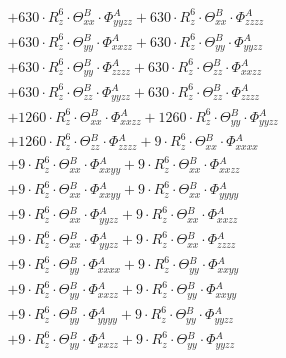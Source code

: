 \documentclass{article}
\begin{document}
\begin{subequations}
\begin{gather}
\begin{array}{c}
 \\[0.2em] 		 + 630 \cdot R_{z}^{6} \cdot \Theta{}^{B}_{xx} \cdot \Phi{}^{A}_{yyzz}+ 630 \cdot R_{z}^{6} \cdot \Theta{}^{B}_{xx} \cdot \Phi{}^{A}_{zzzz} 
 \\[0.2em] 		 + 630 \cdot R_{z}^{6} \cdot \Theta{}^{B}_{yy} \cdot \Phi{}^{A}_{xxzz}+ 630 \cdot R_{z}^{6} \cdot \Theta{}^{B}_{yy} \cdot \Phi{}^{A}_{yyzz} 
 \\[0.2em] 		 + 630 \cdot R_{z}^{6} \cdot \Theta{}^{B}_{yy} \cdot \Phi{}^{A}_{zzzz}+ 630 \cdot R_{z}^{6} \cdot \Theta{}^{B}_{zz} \cdot \Phi{}^{A}_{xxzz} 
 \\[0.2em] 		 + 630 \cdot R_{z}^{6} \cdot \Theta{}^{B}_{zz} \cdot \Phi{}^{A}_{yyzz}+ 630 \cdot R_{z}^{6} \cdot \Theta{}^{B}_{zz} \cdot \Phi{}^{A}_{zzzz} 
 \\[0.2em] 		 + 1260 \cdot R_{z}^{6} \cdot \Theta{}^{B}_{xx} \cdot \Phi{}^{A}_{xxzz}+ 1260 \cdot R_{z}^{6} \cdot \Theta{}^{B}_{yy} \cdot \Phi{}^{A}_{yyzz} 
 \\[0.2em] 		 + 1260 \cdot R_{z}^{6} \cdot \Theta{}^{B}_{zz} \cdot \Phi{}^{A}_{zzzz}+ 9 \cdot R_{z}^{6} \cdot \Theta{}^{B}_{xx} \cdot \Phi{}^{A}_{xxxx} 
 \\[0.2em] 		 + 9 \cdot R_{z}^{6} \cdot \Theta{}^{B}_{xx} \cdot \Phi{}^{A}_{xxyy}+ 9 \cdot R_{z}^{6} \cdot \Theta{}^{B}_{xx} \cdot \Phi{}^{A}_{xxzz} 
 \\[0.2em] 		 + 9 \cdot R_{z}^{6} \cdot \Theta{}^{B}_{xx} \cdot \Phi{}^{A}_{xxyy}+ 9 \cdot R_{z}^{6} \cdot \Theta{}^{B}_{xx} \cdot \Phi{}^{A}_{yyyy} 
 \\[0.2em] 		 + 9 \cdot R_{z}^{6} \cdot \Theta{}^{B}_{xx} \cdot \Phi{}^{A}_{yyzz}+ 9 \cdot R_{z}^{6} \cdot \Theta{}^{B}_{xx} \cdot \Phi{}^{A}_{xxzz} 
 \\[0.2em] 		 + 9 \cdot R_{z}^{6} \cdot \Theta{}^{B}_{xx} \cdot \Phi{}^{A}_{yyzz}+ 9 \cdot R_{z}^{6} \cdot \Theta{}^{B}_{xx} \cdot \Phi{}^{A}_{zzzz} 
 \\[0.2em] 		 + 9 \cdot R_{z}^{6} \cdot \Theta{}^{B}_{yy} \cdot \Phi{}^{A}_{xxxx}+ 9 \cdot R_{z}^{6} \cdot \Theta{}^{B}_{yy} \cdot \Phi{}^{A}_{xxyy} 
 \\[0.2em] 		 + 9 \cdot R_{z}^{6} \cdot \Theta{}^{B}_{yy} \cdot \Phi{}^{A}_{xxzz}+ 9 \cdot R_{z}^{6} \cdot \Theta{}^{B}_{yy} \cdot \Phi{}^{A}_{xxyy} 
 \\[0.2em] 		 + 9 \cdot R_{z}^{6} \cdot \Theta{}^{B}_{yy} \cdot \Phi{}^{A}_{yyyy}+ 9 \cdot R_{z}^{6} \cdot \Theta{}^{B}_{yy} \cdot \Phi{}^{A}_{yyzz} 
 \\[0.2em] 		 + 9 \cdot R_{z}^{6} \cdot \Theta{}^{B}_{yy} \cdot \Phi{}^{A}_{xxzz}+ 9 \cdot R_{z}^{6} \cdot \Theta{}^{B}_{yy} \cdot \Phi{}^{A}_{yyzz} 

\end{array}
\end{gather}
\end{subequations}
\end{document}
